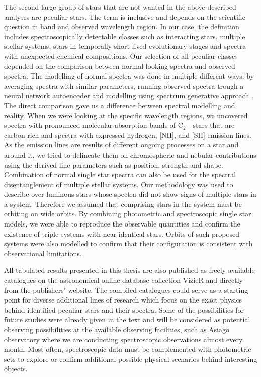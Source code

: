 The second large group of stars that are not wanted in the above-described analyses are peculiar stars. The term is inclusive and depends on the scientific question in hand and observed wavelength region. In our case, the definition includes spectroscopically detectable classes such as interacting stars, multiple stellar systems, stars in temporally short-lived evolutionary stages and spectra with unexpected chemical compositions. Our selection of all peculiar classes depended on the comparison between normal-looking spectra and observed spectra. The modelling of normal spectra was done in multiple different ways: by averaging spectra with similar parameters, running observed spectra trough a neural network autoencoder and modelling using spectrum generative approach \TC. The direct comparison gave us a difference between spectral modelling and reality. When we were looking at the specific wavelength regions, we uncovered spectra with pronounced molecular absorption bands of C$_2$ - stars that are carbon-rich and spectra with expressed hydrogen, [NII], and [SII] emission lines. As the emission lines are results of different ongoing processes on a star and around it, we tried to delineate them on chromospheric and nebular contributions using the derived line parameters such as position, strength and shape. Combination of normal single star spectra can also be used for the spectral disentanglement of multiple stellar systems. Our methodology was used to describe over-luminous stars whose spectra did not show signs of multiple stars in a system. Therefore we assumed that comprising stars in the system must be orbiting on wide orbits. By combining photometric and spectroscopic single star models, we were able to reproduce the observable quantities and confirm the existence of triple systems with near-identical stars. Orbits of such proposed systems were also modelled to confirm that their configuration is consistent with observational limitations.

All tabulated results presented in this thesis are also published as freely available catalogues on the astronomical online database collection VizieR and directly from the publishers' website. The compiled catalogues could serve as a starting point for diverse additional lines of research which focus on the exact physics behind identified peculiar stars and their spectra. Some of the possibilities for future studies were already given in the text and will be considered as potential observing possibilities at the available observing facilities, such as Asiago observatory where we are conducting spectroscopic observations almost every month. Most often, spectroscopic data must be complemented with photometric sets to explore or confirm additional possible physical scenarios behind interesting objects.

